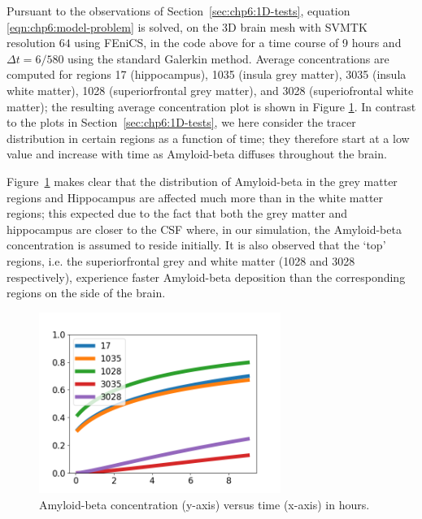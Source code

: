Pursuant to the observations of Section~\ref{sec:chp6:1D-tests}, equation 
\eqref{eqn:chp6:model-problem} is solved, on the 3D brain mesh with SVMTK 
resolution $64$ using FEniCS, in the code above for a time course of 9 hours 
and $\Delta t = 6/580$ using the standard Galerkin method. Average concentrations 
are computed for regions 17 (hippocampus), 1035 (insula grey matter), 3035 
(insula white matter), 1028 (superiorfrontal grey matter), and 3028 
(superiofrontal white matter); the resulting average concentration plot is shown 
in Figure \ref{chp6:regions}. In contrast to the plots in Section~\ref{sec:chp6:1D-tests},  
we here consider the tracer distribution in certain regions as a function of 
time; they therefore start at a low value and increase with time as Amyloid-beta 
diffuses throughout the brain. 

Figure~\ref{chp6:regions} makes clear that the distribution of Amyloid-beta 
in the grey matter regions and Hippocampus are affected much more than in the 
white matter regions; this expected due to the fact that both the grey matter 
and hippocampus are closer to the CSF where, in our simulation, the Amyloid-beta 
concentration is assumed to reside initially.  It is also observed that the 
`top' regions,  i.e. the superiorfrontal grey and white matter (1028 and 3028 
respectively), experience faster Amyloid-beta deposition than the corresponding 
regions on the side of the brain.  
\begin{figure}	
\centering
\includegraphics[width=0.7\textwidth]{./chapters/chp6/FIG/tracer_uniform_notlump_regions_64.png}
\caption{
Amyloid-beta concentration (y-axis) versus time (x-axis) in hours. 
}
\label{chp6:regions}
\end{figure}

